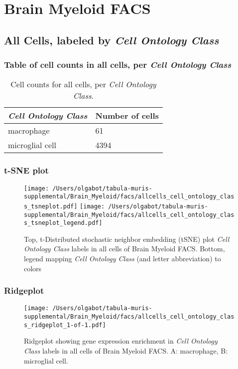 \clearpage
\section{Brain Myeloid FACS}

\subsection{All Cells, labeled by \emph{Cell Ontology Class}}
\subsubsection{Table of cell counts in all cells, per \emph{Cell Ontology Class}}\begin{table}[h]
\centering
\label{my-label}
\begin{tabular}{@{}ll@{}}
\toprule

\emph{Cell Ontology Class}& Number of cells \\ \midrule
macrophage & 61 \\

microglial cell & 4394 \\
\bottomrule
\end{tabular}
\caption{Cell counts for all cells, per \emph{Cell Ontology Class}.}
\end{table}

\clearpage
\subsubsection{t-SNE plot}
\begin{figure}[h]
\centering
\texttt{[image: /Users/olgabot/tabula-muris-supplemental/Brain\_Myeloid/facs/allcells\_cell\_ontology\_class\_tsneplot.pdf]}
\texttt{[image: /Users/olgabot/tabula-muris-supplemental/Brain\_Myeloid/facs/allcells\_cell\_ontology\_class\_tsneplot\_legend.pdf]}
\caption{Top, t-Distributed stochastic neighbor embedding (tSNE) plot  \emph{Cell Ontology Class} labels in all cells of Brain Myeloid FACS. Bottom, legend mapping \emph{Cell Ontology Class} (and letter abbreviation) to colors}
\end{figure}


\clearpage

\subsubsection{Ridgeplot}
\begin{figure}[h]
\centering
\texttt{[image: /Users/olgabot/tabula-muris-supplemental/Brain\_Myeloid/facs/allcells\_cell\_ontology\_class\_ridgeplot\_1-of-1.pdf]}

\caption{ Ridgeplot  showing gene expression enrichment in \emph{Cell Ontology Class} labels in all cells of Brain Myeloid FACS. A: macrophage, B: microglial cell.}
\end{figure}


